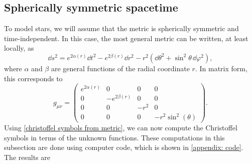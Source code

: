 \subsection*{Spherically symmetric spacetime}

To model stars, we will assume that the metric is spherically symmetric and time-independent.
In this case, the most general metric can be written, at least locally, as~\autocite{carrollSpacetimeGeometryIntroduction2019}
%
\begin{equation}
    \dd s^2 
    = e^{2\alpha(r)} \dd t^2 - e^{2 \beta(r)} \dd r^2 - 
    r^2 (\dd \theta^2 + \sin^2 \theta \, \dd \varphi^2),
\end{equation}
%
where $\alpha$ and $\beta$ are general functions of the radial coordinate $r$.
In matrix form, this corresponds to 
%
\begin{equation}
    \label{spherically symmetric metric}
    g_{\mu \nu} =
    \left(
        \begin{matrix}
            e^{2 \alpha{\left(r \right)}} & 0 & 0 & 0\\
            0 & - e^{2 \beta{\left(r \right)}} & 0 & 0
            \\0 & 0 & - r^{2} & 0
            \\0 & 0 & 0 & - r^{2} \sin^{2}{\left(\theta \right)}
        \end{matrix}
     \right).
\end{equation}
%
Using \autoref{christoffel symbols from metric}, we can now compute the Christoffel symbols in terms of the unknown functions.
These computations in this subsection are done using computer code, which is shown in \autoref{appendix: code}.
The results are
%
